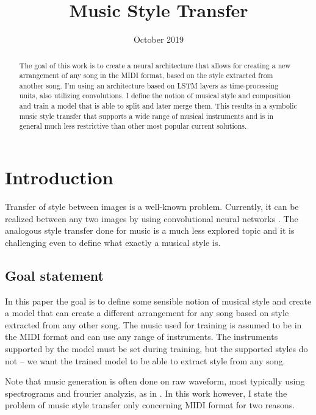 \documentclass[en]{pracamgr}
\title{Music Style Transfer}
\date{October 2019}
\begin{document}
\maketitle

\begin{abstract}
    The goal of this work is to create a neural architecture that allows for creating a new arrangement of any song in the MIDI format, based on the style extracted from another song.
    I'm using an architecture based on LSTM layers as time-processing units, also utilizing convolutions.
    I define the notion of musical style and composition and train a model that is able to split and later merge them.
    This results in a symbolic music style transfer that supports a wide range of musical instruments and is in general much less restrictive than other most popular current solutions.
\end{abstract}

\tableofcontents

\chapter{Introduction}

Transfer of style between images is a well-known problem.
Currently, it can be realized between any two images by using convolutional neural networks \cite{image_style_transfer}.
The analogous style transfer done for music is a much less explored topic and it is challenging even to define what exactly a musical style is.

\section{Goal statement}

In this paper the goal is to define some sensible notion of musical style and create a model that can create a different arrangement for any song based on style extracted from any other song.
The music used for training is assumed to be in the MIDI format and can use any range of instruments.
The instruments supported by the model must be set during training, but the supported styles do not -- we want the trained model to be able to extract style from any song.

Note that music generation is often done on raw waveform, most typically using spectrograms and frourier analyzis, as in \cite{music_generation}.
In this work however, I state the problem of music style transfer only concerning MIDI format for two reasons.
\end{document}
